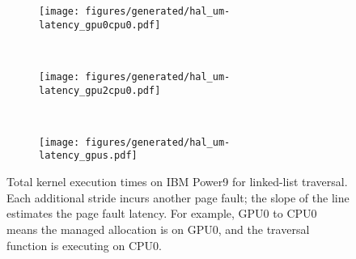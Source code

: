 \begin{figure}[ht]
    \centering
    \begin{subfigure}[b]{0.3\textwidth}
        \texttt{[image: figures/generated/hal\_um-latency\_gpu0cpu0.pdf]}
        \caption{}
        \label{}
    \end{subfigure}
    ~
    \begin{subfigure}[b]{0.3\textwidth}
        \texttt{[image: figures/generated/hal\_um-latency\_gpu2cpu0.pdf]}
        \caption{}
        \label{}
    \end{subfigure}
    ~
    \begin{subfigure}[b]{0.3\textwidth}
        \texttt{[image: figures/generated/hal\_um-latency\_gpus.pdf]}
        \caption{}
        \label{}
    \end{subfigure}
    \caption[]{
        Total kernel execution times on IBM Power9 for linked-list traversal.
        Each additional stride incurs another page fault; the slope of the line estimates the page fault latency.
        For example, GPU0 to CPU0 means the managed allocation is on GPU0, and the traversal function is executing on CPU0.
        }
    \label{fig:hal-page-fault-latency}
\end{figure}

